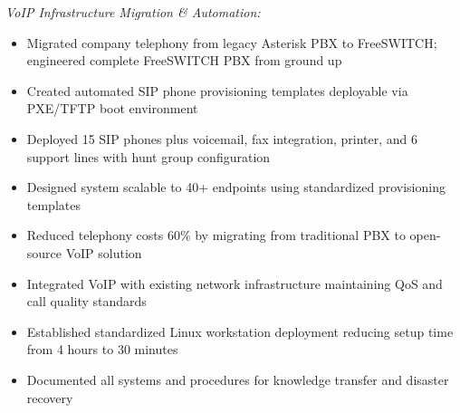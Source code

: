\documentclass[9pt,letterpaper]{extarticle}
\begin{document}
\textit{VoIP Infrastructure Migration \& Automation:}
\begin{itemize}
  \item Migrated company telephony from legacy Asterisk PBX to FreeSWITCH; engineered complete FreeSWITCH PBX from ground up
  \item Created automated SIP phone provisioning templates deployable via PXE/TFTP boot environment
  \item Deployed 15 SIP phones plus voicemail, fax integration, printer, and 6 support lines with hunt group configuration
  \item Designed system scalable to 40+ endpoints using standardized provisioning templates
  \item Reduced telephony costs 60\% by migrating from traditional PBX to open-source VoIP solution
  \item Integrated VoIP with existing network infrastructure maintaining QoS and call quality standards
  \item Established standardized Linux workstation deployment reducing setup time from 4 hours to 30 minutes
  \item Documented all systems and procedures for knowledge transfer and disaster recovery
\end{itemize}
\end{document}
